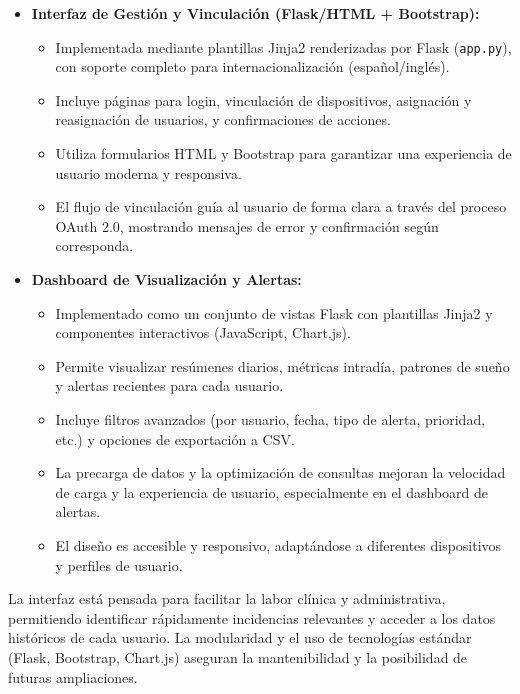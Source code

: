 \begin{itemize}
    \item \textbf{Interfaz de Gestión y Vinculación (Flask/HTML + Bootstrap):}
        \begin{itemize}
            \item Implementada mediante plantillas Jinja2 renderizadas por Flask (\texttt{app.py}), con soporte completo para internacionalización (español/inglés).
            \item Incluye páginas para login, vinculación de dispositivos, asignación y reasignación de usuarios, y confirmaciones de acciones.
            \item Utiliza formularios HTML y Bootstrap para garantizar una experiencia de usuario moderna y responsiva.
            \item El flujo de vinculación guía al usuario de forma clara a través del proceso OAuth 2.0, mostrando mensajes de error y confirmación según corresponda.
        \end{itemize}
    \item \textbf{Dashboard de Visualización y Alertas:}
        \begin{itemize}
            \item Implementado como un conjunto de vistas Flask con plantillas Jinja2 y componentes interactivos (JavaScript, Chart.js).
            \item Permite visualizar resúmenes diarios, métricas intradía, patrones de sueño y alertas recientes para cada usuario.
            \item Incluye filtros avanzados (por usuario, fecha, tipo de alerta, prioridad, etc.) y opciones de exportación a CSV.
            \item La precarga de datos y la optimización de consultas mejoran la velocidad de carga y la experiencia de usuario, especialmente en el dashboard de alertas.
            \item El diseño es accesible y responsivo, adaptándose a diferentes dispositivos y perfiles de usuario.
        \end{itemize}
\end{itemize}

La interfaz está pensada para facilitar la labor clínica y administrativa, permitiendo identificar rápidamente incidencias relevantes y acceder a los datos históricos de cada usuario. La modularidad y el uso de tecnologías estándar (Flask, Bootstrap, Chart.js) aseguran la mantenibilidad y la posibilidad de futuras ampliaciones.

